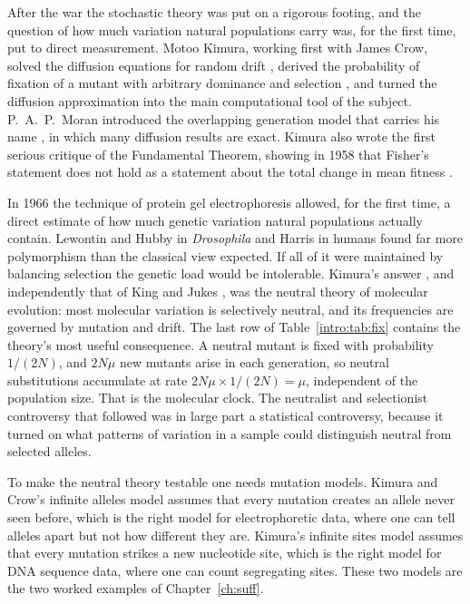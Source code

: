 After the war the stochastic theory was put on a rigorous footing, and the question of how much
variation natural populations carry was, for the first time, put to direct measurement. Motoo
Kimura, working first with James Crow, solved the diffusion equations for random drift
\citep{intro:kimura1955}, derived the probability of fixation of a mutant with arbitrary dominance
and selection \citep{intro:kimura1962}, and turned the diffusion approximation into the main
computational tool of the subject. P.~A.~P.\ Moran introduced the overlapping generation model that
carries his name \citep{intro:moran1958}, in which many diffusion results are exact. Kimura also
wrote the first serious critique of the Fundamental Theorem, showing in 1958 that Fisher's
statement does not hold as a statement about the total change in mean fitness
\citep{intro:kimura1958}.

In 1966 the technique of protein gel electrophoresis allowed, for the first time, a direct
estimate of how much genetic variation natural populations actually contain. Lewontin and Hubby in
\emph{Drosophila} \citep{intro:lewontin1966} and Harris in humans \citep{intro:harris1966} found far
more polymorphism than the classical view expected. If all of it were maintained by balancing
selection the genetic load would be intolerable. Kimura's answer \citep{intro:kimura1968}, and
independently that of King and Jukes \citep{intro:king1969}, was the neutral theory of molecular
evolution: most molecular variation is selectively neutral, and its frequencies are governed by
mutation and drift. The last row of Table~\ref{intro:tab:fix} contains the theory's most useful
consequence. A neutral mutant is fixed with probability $1/(2N)$, and $2N\mu$ new mutants arise in
each generation, so neutral substitutions accumulate at rate $2N\mu\times1/(2N)=\mu$, independent
of the population size. That is the molecular clock. The neutralist and selectionist controversy
that followed was in large part a statistical controversy, because it turned on what patterns of
variation in a sample could distinguish neutral from selected alleles.

To make the neutral theory testable one needs mutation models. Kimura and Crow's infinite alleles
model \citep{intro:kimura1964} assumes that every mutation creates an allele never seen before, which
is the right model for electrophoretic data, where one can tell alleles apart but not how different
they are. Kimura's infinite sites model \citep{intro:kimura1969} assumes that every mutation strikes a
new nucleotide site, which is the right model for DNA sequence data, where one can count
segregating sites. These two models are the two worked examples of Chapter~\ref{ch:suff}.

